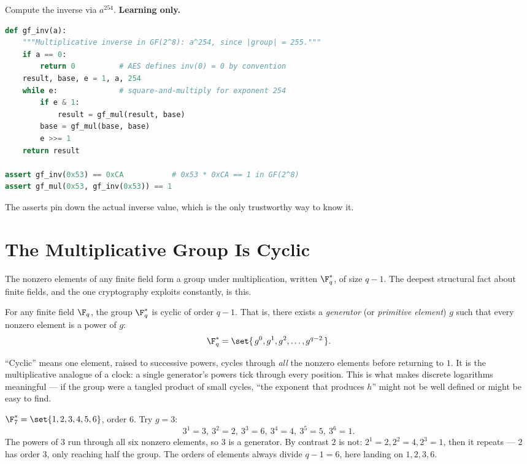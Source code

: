 \begin{implementbox}
Compute the inverse via $a^{254}$. \textbf{Learning only.}
\begin{lstlisting}[language=Python]
def gf_inv(a):
    """Multiplicative inverse in GF(2^8): a^254, since |group| = 255."""
    if a == 0:
        return 0          # AES defines inv(0) = 0 by convention
    result, base, e = 1, a, 254
    while e:              # square-and-multiply for exponent 254
        if e & 1:
            result = gf_mul(result, base)
        base = gf_mul(base, base)
        e >>= 1
    return result

assert gf_inv(0x53) == 0xCA           # 0x53 * 0xCA == 1 in GF(2^8)
assert gf_mul(0x53, gf_inv(0x53)) == 1
\end{lstlisting}
The asserts pin down the actual inverse value, which is the only trustworthy
way to know it.
\end{implementbox}

\section{The Multiplicative Group Is Cyclic}
\label{ch06:cyclic}

The nonzero elements of any finite field form a group under multiplication,
written $\F_q^{*}$, of size $q-1$. The deepest structural fact about finite
fields, and the one cryptography exploits constantly, is this.

\begin{theorem}
\label{ch06:thm-cyclic}
For any finite field $\F_q$, the group $\F_q^{*}$ is cyclic of order $q-1$.
That is, there exists a \emph{generator} (or \emph{primitive element})
$g$ such that every nonzero element is a power of $g$:
\[
\F_q^{*} = \set{\, g^0, g^1, g^2, \dots, g^{q-2} \,}.
\]
\end{theorem}

\begin{intuitionbox}
``Cyclic'' means one element, raised to successive powers, cycles through
\emph{all} the nonzero elements before returning to $1$. It is the
multiplicative analogue of a clock: a single generator's powers tick through
every position. This is what makes discrete logarithms meaningful --- if the
group were a tangled product of small cycles, ``the exponent that produces
$h$'' might not be well defined or might be easy to find.
\end{intuitionbox}

\begin{example}[A generator of $\F_7^{*}$]
\label{ch06:ex-gen7}
$\F_7^{*} = \set{1,2,3,4,5,6}$, order $6$. Try $g=3$:
\[
3^1=3,\ 3^2=2,\ 3^3=6,\ 3^4=4,\ 3^5=5,\ 3^6=1.
\]
The powers of $3$ run through all six nonzero elements, so $3$ is a
generator. By contrast $2$ is not: $2^1=2, 2^2=4, 2^3=1$, then it repeats ---
$2$ has order $3$, only reaching half the group. The orders of elements
always divide $q-1=6$, here landing on $1,2,3,6$.
\end{example}

